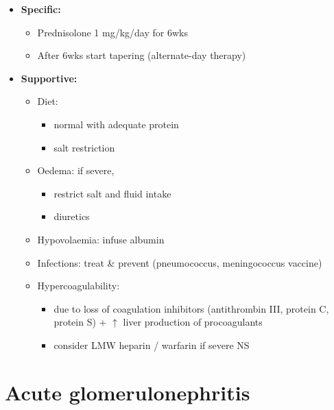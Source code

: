 \documentclass[
  12pt,
]{memoir}
\providecommand{\tightlist}{%
  \setlength{\itemsep}{0pt}\setlength{\parskip}{0pt}}
\begin{document}
\begin{itemize}
\tightlist
\item
  \textbf{Specific:}

  \begin{itemize}
  \tightlist
  \item
    Prednisolone 1 mg/kg/day for 6wks
  \item
    After 6wks start tapering (alternate-day therapy)
  \end{itemize}
\item
  \textbf{Supportive:}

  \begin{itemize}
  \tightlist
  \item
    Diet:

    \begin{itemize}
    \tightlist
    \item
      normal with adequate protein
    \item
      salt restriction
    \end{itemize}
  \item
    Oedema: if severe,

    \begin{itemize}
    \tightlist
    \item
      restrict salt and fluid intake
    \item
      diuretics
    \end{itemize}
  \item
    Hypovolaemia: infuse albumin
  \item
    Infections: treat \& prevent (pneumococcus, meningococcus vaccine)
  \item
    Hypercoagulability:

    \begin{itemize}
    \tightlist
    \item
      due to loss of coagulation inhibitors (antithrombin III, protein
      C, protein S) + \(\uparrow\) liver production of procoagulants
    \item
      consider LMW heparin / warfarin if severe NS
    \end{itemize}
  \end{itemize}
\end{itemize}

\hypertarget{acute-glomerulonephritis}{%
\section{Acute glomerulonephritis}\label{acute-glomerulonephritis}}
\end{document}
